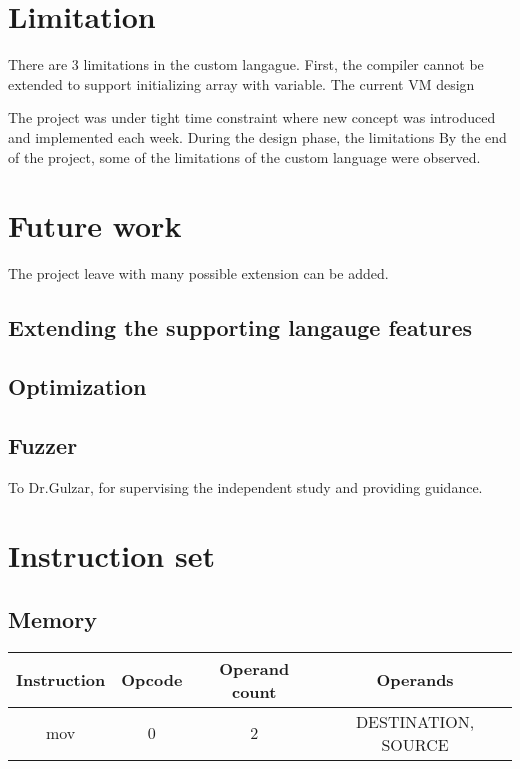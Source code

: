 \documentclass[manuscript,screen,nonacm]{acmart}
\begin{document}
\section{Limitation}
There are 3 limitations in the custom langague. First, the compiler cannot be extended to support initializing array with variable. The current VM design 


The project was under tight time constraint where new concept was introduced and implemented each week. During the design phase, the limitations By the end of the project, some of the limitations of the custom language were observed. 

\section{Future work}
The project leave with many possible extension can be added.
\subsection{Extending the supporting langauge features}
\subsection{Optimization}
\subsection{Fuzzer}

\begin{acks}
To Dr.Gulzar, for supervising the independent study and providing guidance.
\end{acks}




\appendix

\section{Instruction set}
\subsection{Memory}
\begin{center}
\begin{tabular}{|c|c|c|c|}
    \hline
    Instruction & Opcode & Operand count & Operands \\
    \hline
    mov & 0 & 2 & DESTINATION, SOURCE \\
    \hline
\end{tabular}
\end{center}
\end{document}
